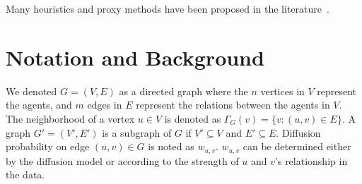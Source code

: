 \documentclass[10pt,journal,compsoc]{IEEEtran}
\begin{document}
Many heuristics and proxy methods have been proposed in the literature~\cite{MixGreedy, narayanam2010shapley, kimura2007extracting, chen2010PMIA,chen2010LDAG, kim2013scalable, skim, goyal2011simpath, jung2012irie,cheng2014imrank,liu2014influence,galhotra2016holistic}.


\section{Notation and Background}\label{sec:background}

We denoted $G = (V,E)$ as a directed graph where the $n$ vertices in $V$ represent the agents, and $m$ edges in $E$ represent the relations between the agents in $V$.
The neighborhood of a vertex $u \in V$ is denoted as $\Gamma_G(v) = \{v: (u,v) \in E\}$. 
A graph $G' = (V',E')$ is a subgraph of $G$ if $V' \subseteq V$ and $E' \subseteq E$. 
Diffusion probability on edge $(u, v) \in G$ is noted as $w_{u,v}$.
$w_{u,v}$ can be determined either by the diffusion model or according to the strength of $u$ and $v$'s relationship in the data.
\end{document}
